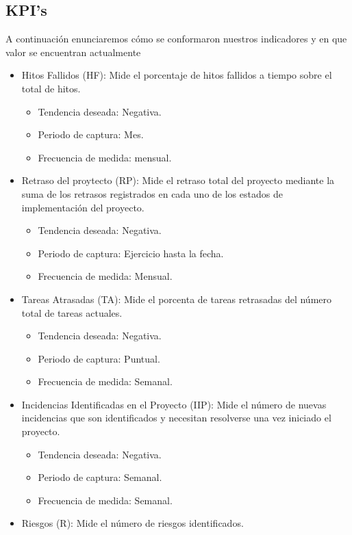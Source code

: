 \subsection{KPI's}
\label{sec:descripción}
A continuación enunciaremos cómo se conformaron nuestros indicadores y en que valor se encuentran actualmente
\begin{itemize}
\item Hitos Fallidos (HF): Mide el porcentaje de hitos fallidos a tiempo sobre el total de hitos.
	\begin{itemize}
    	\item Tendencia deseada: Negativa.
		\item Periodo de captura: Mes.
		\item Frecuencia de medida: mensual.
	\end{itemize}
\item Retraso del proytecto (RP): Mide el retraso total del proyecto mediante la suma de los retrasos registrados en cada uno de los estados de implementación del proyecto.
	\begin{itemize}
    	\item Tendencia deseada: Negativa.
		\item Periodo de captura: Ejercicio hasta la fecha.
		\item Frecuencia de medida: Mensual.
	\end{itemize}
\item Tareas Atrasadas (TA): Mide el porcenta de tareas retrasadas del número total de tareas actuales.
	\begin{itemize}
    	\item Tendencia deseada: Negativa.
		\item Periodo de captura: Puntual.
		\item Frecuencia de medida: Semanal.
	\end{itemize}
\item Incidencias Identificadas en el Proyecto (IIP): Mide el número de nuevas incidencias que son identificados y necesitan resolverse una vez iniciado el proyecto.
	\begin{itemize}
    	\item Tendencia deseada: Negativa.
		\item Periodo de captura: Semanal.
		\item Frecuencia de medida: Semanal.
	\end{itemize}
\item Riesgos (R): Mide el número de riesgos identificados.
	\begin{itemize}

\end{itemize}
\end{itemize}
